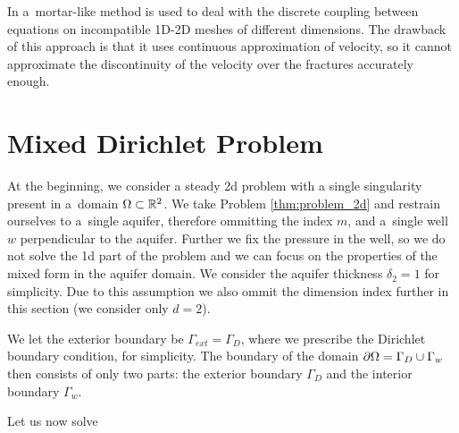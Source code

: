 In \cite{brezina_2012} a~mortar-like method is used to deal with the discrete coupling between equations on incompatible 1D-2D meshes 
of different dimensions. The drawback of this approach is that it uses continuous approximation of velocity, so
it cannot approximate the discontinuity of the velocity over the fractures accurately enough.


\section{Mixed Dirichlet Problem}

At the beginning, we consider a steady 2d problem with a single singularity present in a~domain $\Omega\subset\mathbb{R}^2$.
We take Problem \ref{thm:problem_2d} and restrain ourselves to a~single aquifer, therefore ommitting the index $m$,
and a~single well $w$ perpendicular to the aquifer. Further we fix the pressure in the well,
so we do not solve the 1d part of the problem
and we can focus on the properties of the mixed form in the aquifer domain.
We consider the aquifer thickness $\delta_2=1$ for simplicity.
Due to this assumption we also ommit the dimension index further in this section (we consider only $d=2$).

We let the exterior boundary be  $\Gamma_{ext}=\Gamma_D$, where we prescribe the Dirichlet boundary condition, for simplicity.
The boundary of the domain $\partial\Omega=\Gamma_D \cup \Gamma_w$ then consists of only two parts: the exterior boundary $\Gamma_D$
and the interior boundary $\Gamma_w$.

Let us now solve

